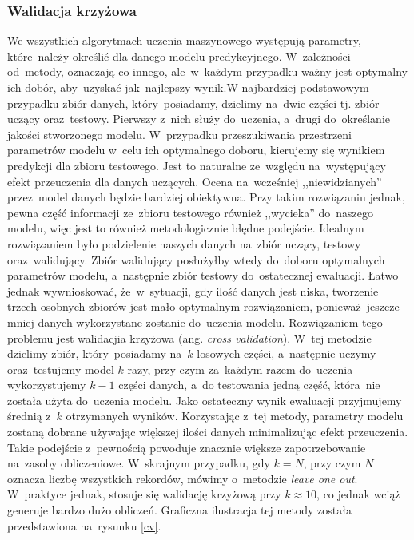 \subsubsection{Walidacja krzyżowa}
We wszystkich algorytmach uczenia maszynowego występują parametry, które~należy określić dla danego modelu predykcyjnego. W~zależności od~metody, oznaczają co innego, ale~w~każdym przypadku ważny jest optymalny ich dobór, aby~uzyskać jak~najlepszy wynik.W najbardziej podstawowym przypadku zbiór danych, który~posiadamy, dzielimy na~dwie części tj. zbiór uczący oraz~testowy. Pierwszy z~nich służy do~uczenia, a~drugi do~określanie jakości stworzonego modelu. W~przypadku przeszukiwania przestrzeni parametrów modelu w~celu ich optymalnego doboru, kierujemy się wynikiem predykcji dla zbioru testowego. Jest to naturalne ze~względu na~występujący efekt przeuczenia dla danych uczących. Ocena na~wcześniej ,,niewidzianych'' przez~model danych będzie bardziej obiektywna. Przy takim rozwiązaniu jednak, pewna część informacji ze~zbioru testowego również ,,wycieka'' do~naszego modelu, więc jest to również metodologicznie błędne podejście. Idealnym rozwiązaniem było podzielenie naszych danych na~zbiór uczący, testowy oraz~walidujący. Zbiór walidujący posłużyłby wtedy do~doboru optymalnych parametrów modelu, a~następnie zbiór testowy do~ostatecznej ewaluacji. Łatwo jednak wywnioskować, że~w~sytuacji, gdy ilość danych jest niska, tworzenie trzech osobnych zbiorów jest mało optymalnym rozwiązaniem, ponieważ~jeszcze mniej danych wykorzystane zostanie do~uczenia modelu. Rozwiązaniem tego problemu jest walidacjia krzyżowa (ang. \textit{cross validation}). W~tej metodzie dzielimy zbiór, który~posiadamy na~$k$ losowych części, a~następnie uczymy oraz~testujemy model $k$ razy, przy czym za~każdym razem do~uczenia wykorzystujemy $k-1$ części danych, a~do testowania jedną część, która~nie została użyta do~uczenia modelu. Jako ostateczny wynik ewaluacji przyjmujemy średnią z~$k$ otrzymanych wyników. Korzystając z~tej metody, parametry modelu zostaną dobrane używając większej ilości danych minimalizując efekt przeuczenia. Takie podejście z~pewnością powoduje znacznie większe zapotrzebowanie na~zasoby obliczeniowe. W~skrajnym przypadku, gdy $k=N$, przy czym $N$ oznacza liczbę wszystkich rekordów, mówimy o~metodzie \textit{leave one out}. W~praktyce jednak, stosuje się walidację krzyżową przy $k \approx 10$, co jednak wciąż generuje bardzo dużo obliczeń. Graficzna ilustracja tej metody została przedstawiona na~rysunku \ref{cv}.
